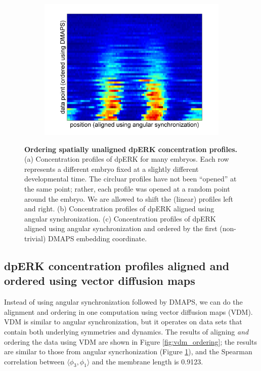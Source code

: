 \documentclass[10pt]{article}
\begin{document}
\begin{figure}[!ht]
\begin{subfigure}{0.3\textwidth}
\includegraphics[width=\textwidth]{data_ordered_angsynch}
\caption{}
\end{subfigure}
\caption{{\bf Ordering spatially unaligned dpERK concentration profiles.} (a) Concentration profiles of dpERK for many embryos. Each row represents a different embryo fixed at a slightly different developmental time. The circluar profiles have not been ``opened'' at the same point; rather, each profile was opened at a random point around the embryo. We are allowed to shift the (linear) profiles left and right.
(b) Concentration profiles of dpERK aligned using angular synchronization.
(c) Concentration profiles of dpERK aligned using angular synchronization and ordered by the first (non-trivial) DMAPS embedding coordinate.}
\label{fig:angsynch_ordering}
\end{figure}

\subsection*{dpERK concentration profiles aligned and ordered using vector diffusion maps}

Instead of using angular synchronization followed by DMAPS, we can do the alignment and ordering in one computation using vector diffusion maps (VDM).
%
VDM is similar to angular synchronization, but it operates on data sets that contain both underlying symmetries and dynamics.
%
The results of aligning {\em and} ordering the data using VDM are shown in Figure \ref{fig:vdm_ordering}; the results are similar to those from angular syncrhonization (Figure \ref{fig:angsynch_ordering}), and the Spearman correlation between $\langle \phi_3, \phi_1 \rangle$ and the membrane length is 0.9123.
\end{document}
